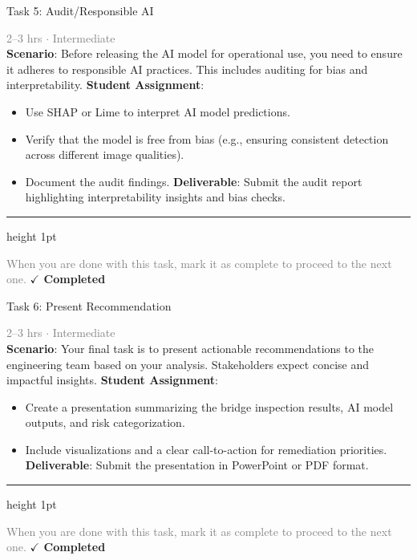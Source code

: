 \documentclass[10pt,a4paper]{article}
\begin{document}
\begin{taskbox}{Task 5: Audit/Responsible AI}

    {\small \textcolor{gray}{2--3 hrs $\cdot$ Intermediate}}\\[12pt]

    \textbf{Scenario}: Before releasing the AI model for operational use, you need to ensure it adheres to responsible AI practices. This includes auditing for bias and interpretability.  
\textbf{Student Assignment}:  
\begin{itemize}
    \item Use SHAP or Lime to interpret AI model predictions.  
    \item Verify that the model is free from bias (e.g., ensuring consistent detection across different image qualities).  
    \item Document the audit findings.  
\textbf{Deliverable}: Submit the audit report highlighting interpretability insights and bias checks.\par
\end{itemize}

    \vspace{16pt}

    \textcolor{cardBorder}{\hrule height 1pt}\vspace{8pt}

    \small \textcolor{gray}{When you are done with this task, mark it as complete to proceed to the next one.} \hfill \textbf{\textcolor{brandDark}{$\checkmark$ Completed}}

\end{taskbox}

\begin{taskbox}{Task 6: Present Recommendation}

    {\small \textcolor{gray}{2--3 hrs $\cdot$ Intermediate}}\\[12pt]

    \textbf{Scenario}: Your final task is to present actionable recommendations to the engineering team based on your analysis. Stakeholders expect concise and impactful insights.  
\textbf{Student Assignment}:  
\begin{itemize}
    \item Create a presentation summarizing the bridge inspection results, AI model outputs, and risk categorization.  
    \item Include visualizations and a clear call-to-action for remediation priorities.  
\textbf{Deliverable}: Submit the presentation in PowerPoint or PDF format.\par
\end{itemize}

    \vspace{16pt}

    \textcolor{cardBorder}{\hrule height 1pt}\vspace{8pt}

    \small \textcolor{gray}{When you are done with this task, mark it as complete to proceed to the next one.} \hfill \textbf{\textcolor{brandDark}{$\checkmark$ Completed}}

\end{taskbox}
\end{document}

